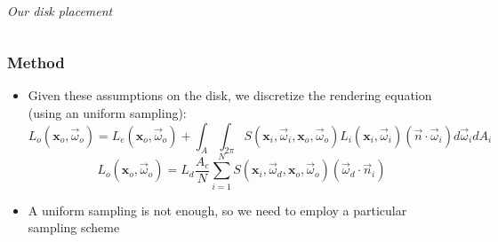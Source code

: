 \documentclass{beamer}
\newcommand{\vomega}{\vec{\omega}}
\newcommand{\x}{\mathbf{x}}
\begin{document}
\begin{frame}
\begin{columns}
\begin{column}{0.5\textwidth}
		\\\textit{Our disk placement}
    \end{column}
​  \end{columns}
\end{frame}

\begin{frame}
    \frametitle{Method}
			\begin{itemize}
			\item Given these assumptions on the disk, we discretize the rendering equation (using an uniform sampling):
				$$L_o(\x_o,\vomega_o) = L_e(\x_o,\vomega_o) + \int_A \int_{2\pi} S(\x_i, \vomega_i, \x_o, \vomega_o) L_i(\x_i,\vomega_i) (\vec{n} \cdot \vomega_i) d\vomega_i d A_i$$
				$$
				L_o(\x_o,\vomega_o) = L_d \frac{A_c}{N} \sum_{i = 1}^N S(\x_i, \vomega_d, \x_o, \vomega_o) (\vomega_d \cdot \vec{n}_i)
				$$
   		\item A uniform sampling is not enough, so we need to employ a particular sampling scheme 		
			\end{itemize}

\end{frame}
\end{document}
